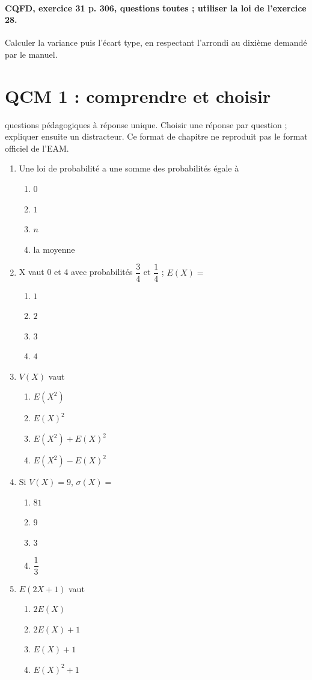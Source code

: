 \paragraph{CQFD, exercice 31 p. 306, questions toutes ; utiliser la loi de l’exercice 28.}\label{C08-M2} Calculer la variance puis l’écart type, en respectant l’arrondi au dixième demandé par le manuel.
\begingroup\small
\mxnewpage\section*{QCM 1 : comprendre et choisir}\label{C08-Q1}
 questions pédagogiques à réponse unique. Choisir une réponse par question ; expliquer ensuite un distracteur. Ce format de chapitre ne reproduit pas le format officiel de l’EAM.
\begin{enumerate}
\item Une loi de probabilité a une somme des probabilités égale à
\begin{enumerate}[label=\Alph*.,itemsep=2pt]
\item $0$
\item $1$
\item $n$
\item la moyenne
\end{enumerate}
\item X vaut 0 et 4 avec probabilités $\dfrac{3}{4}$ et $\dfrac{1}{4}$ ; $E(X)=$
\begin{enumerate}[label=\Alph*.,itemsep=2pt]
\item $1$
\item $2$
\item $3$
\item $4$
\end{enumerate}
\item $V(X)$ vaut
\begin{enumerate}[label=\Alph*.,itemsep=2pt]
\item $E(X^2)$
\item $E(X)^2$
\item $E(X^2)+E(X)^2$
\item $E(X^2)-E(X)^2$
\end{enumerate}
\item Si $V(X)=9$, $\sigma(X)=$
\begin{enumerate}[label=\Alph*.,itemsep=2pt]
\item $81$
\item $9$
\item $3$
\item $\dfrac{1}{3}$
\end{enumerate}
\item $E(2X+1)$ vaut
\begin{enumerate}[label=\Alph*.,itemsep=2pt]
\item $2E(X)$
\item $2E(X)+1$
\item $E(X)+1$
\item $E(X)^2+1$
\end{enumerate}
\end{enumerate}

